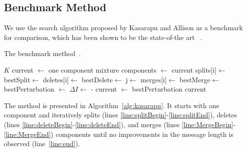 \documentclass{elsarticle}
\begin{document}
\subsection{Benchmark Method}
We use the search algorithm proposed by Kasarapu and Allison as a benchmark for comparison, which
has been shown to be the state-of-the art
~\cite{kasarapu2015minimum}. 
\begin{algorithm}[H]
\caption{The benchmark method~\cite{kasarapu2015minimum}.}
\label{alg:kasarapu}
\begin{algorithmic}[1]
 $K$ 
\State current $\leftarrow$ one component mixture
\State components $\leftarrow$ current
  \label{line:splitBegin}
    \State splits[i]$\leftarrow$ 
  \EndFor
\State  bestSplit$\leftarrow$\label{line:splitEnd} 
  \label{line:deleteBegin}
    \State deletes[i]$\leftarrow$ 
  \EndFor
\State  bestDelete$\leftarrow$ \label{line:deleteEnd}
\EndIf
  \label{line:MergeBegin}
    \State j$\leftarrow$ 
    \State merges[i]$\leftarrow$ 
  \EndFor
\State  bestMerge$\leftarrow$ \label{line:MergeEnd}
\State bestPerturbation $\leftarrow$  
\State $\Delta I \leftarrow$ - 
\State current $\leftarrow$ bestPerturbation
\EndIf
{} \label{line:end}
\EndWhile
{} current
\end{algorithmic}
\end{algorithm}

The method is presented in Algorithm~\ref{alg:kasarapu}. It starts with one component and iteratively splits (lines \ref{line:splitBegin}-\ref{line:splitEnd}), deletes (lines \ref{line:deleteBegin}-\ref{line:deleteEnd}), and merges (lines \ref{line:MergeBegin}-\ref{line:MergeEnd}) components until no improvements in the message length is observed (line~\ref{line:end}). 
\end{document}
